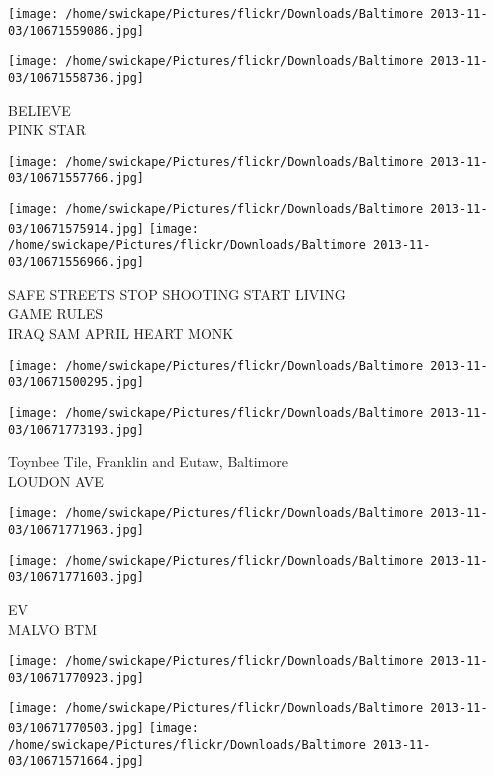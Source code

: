 \documentclass[10pt,letterpaper]{article}
\begin{document}
\texttt{[image: /home/swickape/Pictures/flickr/Downloads/Baltimore 2013-11-03/10671559086.jpg]}

\vspace{0.25in}
\texttt{[image: /home/swickape/Pictures/flickr/Downloads/Baltimore 2013-11-03/10671558736.jpg]}

BELIEVE\\
PINK STAR\\
\pagebreak

\texttt{[image: /home/swickape/Pictures/flickr/Downloads/Baltimore 2013-11-03/10671557766.jpg]}

\vspace{0.25in}
\texttt{[image: /home/swickape/Pictures/flickr/Downloads/Baltimore 2013-11-03/10671575914.jpg]}
\texttt{[image: /home/swickape/Pictures/flickr/Downloads/Baltimore 2013-11-03/10671556966.jpg]}

SAFE STREETS STOP SHOOTING START LIVING\\
GAME RULES\\
IRAQ SAM APRIL HEART MONK\\
\pagebreak

\texttt{[image: /home/swickape/Pictures/flickr/Downloads/Baltimore 2013-11-03/10671500295.jpg]}

\vspace{0.25in}
\texttt{[image: /home/swickape/Pictures/flickr/Downloads/Baltimore 2013-11-03/10671773193.jpg]}

Toynbee Tile, Franklin and Eutaw, Baltimore\\
LOUDON AVE\\
\pagebreak

\texttt{[image: /home/swickape/Pictures/flickr/Downloads/Baltimore 2013-11-03/10671771963.jpg]}

\vspace{0.25in}
\texttt{[image: /home/swickape/Pictures/flickr/Downloads/Baltimore 2013-11-03/10671771603.jpg]}

EV\\
MALVO BTM\\
\pagebreak

\texttt{[image: /home/swickape/Pictures/flickr/Downloads/Baltimore 2013-11-03/10671770923.jpg]}

\vspace{0.25in}
\texttt{[image: /home/swickape/Pictures/flickr/Downloads/Baltimore 2013-11-03/10671770503.jpg]}
\texttt{[image: /home/swickape/Pictures/flickr/Downloads/Baltimore 2013-11-03/10671571664.jpg]}
\end{document}
